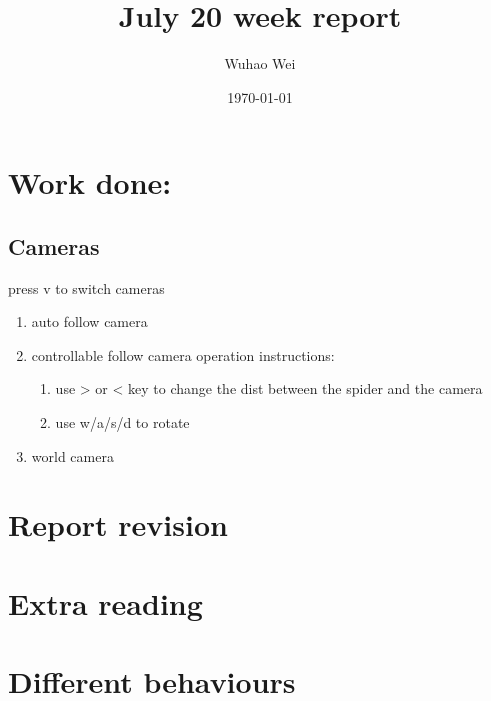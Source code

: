 \documentclass[11pt]{article}
\author{Wuhao Wei}
\date{\today}
\title{July 20 week report}
\begin{document}
\maketitle
\tableofcontents


\section{Work done:}
\label{sec-1}

\subsection{Cameras}
\label{sec-1-1}
press v to switch cameras
\begin{enumerate}
\item auto follow camera
\item controllable follow camera
operation instructions:
\begin{enumerate}
\item use > or < key to change the dist between the spider and the camera
\item use w/a/s/d to rotate
\end{enumerate}
\item world camera
\end{enumerate}


\section{Report revision}
\label{sec-2}

\section{Extra reading}
\label{sec-3}

\section{Different behaviours}
\label{sec-4}
\end{document}
